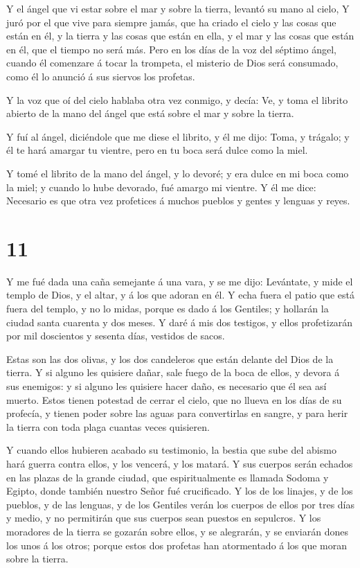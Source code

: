  Y el ángel que vi estar sobre el mar y sobre la tierra,
levantó su mano al cielo,  Y juró por el que vive para
siempre jamás, que ha criado el cielo y las cosas que están en él, y la
tierra y las cosas que están en ella, y el mar y las cosas que están en
él, que el tiempo no será más.  Pero en los días de la voz
del séptimo ángel, cuando él comenzare á tocar la trompeta, el misterio
de Dios será consumado, como él lo anunció á sus siervos los profetas.

 Y la voz que oí del cielo hablaba otra vez conmigo, y
decía: Ve, y toma el librito abierto de la mano del ángel que está sobre
el mar y sobre la tierra.

 Y fuí al ángel, diciéndole que me diese el librito, y él me
dijo: Toma, y trágalo; y él te hará amargar tu vientre, pero en tu boca
será dulce como la miel.

 Y tomé el librito de la mano del ángel, y lo devoré; y era
dulce en mi boca como la miel; y cuando lo hube devorado, fué amargo mi
vientre.  Y él me dice: Necesario es que otra vez
profetices á muchos pueblos y gentes y lenguas y reyes.

\hypertarget{section-10}{%
\section{11}\label{section-10}}

 Y me fué dada una caña semejante á una vara, y se me dijo:
Levántate, y mide el templo de Dios, y el altar, y á los que adoran en
él.  Y echa fuera el patio que está fuera del templo, y no
lo midas, porque es dado á los Gentiles; y hollarán la ciudad santa
cuarenta y dos meses.  Y daré á mis dos testigos, y ellos
profetizarán por mil doscientos y sesenta días, vestidos de sacos.

 Estas son las dos olivas, y los dos candeleros que están
delante del Dios de la tierra.  Y si alguno les quisiere
dañar, sale fuego de la boca de ellos, y devora á sus enemigos: y si
alguno les quisiere hacer daño, es necesario que él sea así muerto.
 Estos tienen potestad de cerrar el cielo, que no llueva en
los días de su profecía, y tienen poder sobre las aguas para
convertirlas en sangre, y para herir la tierra con toda plaga cuantas
veces quisieren.

 Y cuando ellos hubieren acabado su testimonio, la bestia
que sube del abismo hará guerra contra ellos, y los vencerá, y los
matará.  Y sus cuerpos serán echados en las plazas de la
grande ciudad, que espiritualmente es llamada Sodoma y Egipto, donde
también nuestro Señor fué crucificado.  Y los de los
linajes, y de los pueblos, y de las lenguas, y de los Gentiles verán los
cuerpos de ellos por tres días y medio, y no permitirán que sus cuerpos
sean puestos en sepulcros.  Y los moradores de la tierra se
gozarán sobre ellos, y se alegrarán, y se enviarán dones los unos á los
otros; porque estos dos profetas han atormentado á los que moran sobre
la tierra.

